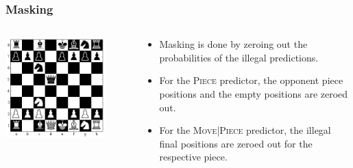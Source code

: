 \documentclass[9pt, unknownkeysallowed]{beamer}
\begin{document}
\begin{frame}
 \frametitle{Masking}
\begin{columns}
 \begin{column}{5cm}
 \includegraphics[width=0.8\textwidth]{../img/table_evaluations/output_11_0.png}
  \end{column}
  \begin{column}{5cm}
  \begin{itemize}
   \item Masking is done by zeroing out the probabilities of the illegal 
predictions.
  \item For the \textsc{Piece} predictor, the opponent piece positions and the 
empty positions are zeroed out.
  \item For the \textsc{Move|Piece} predictor, the illegal final positions are 
zeroed out for the respective piece.
  \end{itemize}
 \end{column}

\end{columns}



\end{frame}
\end{document}
